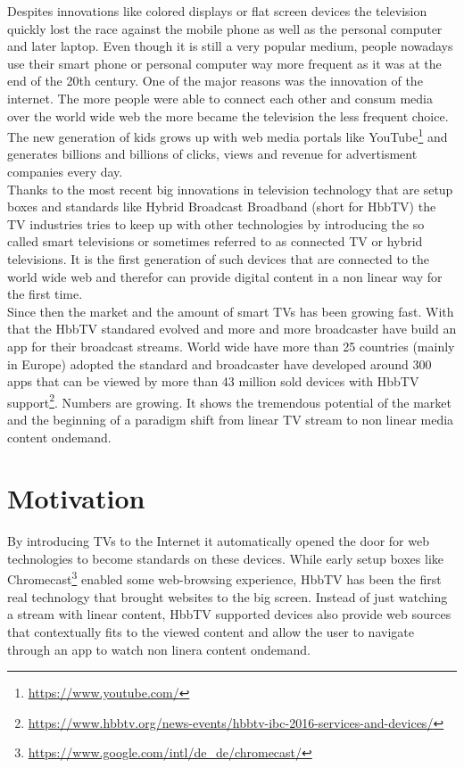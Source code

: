 Despites innovations like colored displays or flat screen devices the television quickly lost the race against
the mobile phone as well as the personal computer and later laptop. Even though it is still a very popular
medium, people nowadays use their smart phone or personal computer way more frequent as it was at the end of the
20th century. One of the major reasons was the innovation of the internet. The more people were able to connect
each other and consum media over the world wide web the more became the television the less frequent choice.
The new generation of kids grows up with web media portals like YouTube\footnote{\url{https://www.youtube.com/}}
and generates billions and billions of clicks, views and revenue for advertisment companies every day.\\
Thanks to the most recent big innovations in television technology that are setup boxes and standards like
Hybrid Broadcast Broadband (short for HbbTV) the TV industries tries to keep up with other technologies by
introducing the so called smart televisions or sometimes referred to as connected TV or hybrid televisions.
It is the first generation of such devices that are connected to the world wide web and therefor can provide
digital content in a non linear way for the first time.\\
Since then the market and the amount of smart TVs has been growing fast. With that the HbbTV standared evolved
and more and more broadcaster have build an app for their broadcast streams. World wide have more than 25
countries (mainly in Europe) adopted the standard and broadcaster have developed around 300 apps that can
be viewed by more than 43 million sold devices with HbbTV support\footnote{\url{https://www.hbbtv.org/news-events/hbbtv-ibc-2016-services-and-devices/}}.
Numbers are growing. It shows the tremendous potential of the market and the beginning of a paradigm shift
from linear TV stream to non linear media content ondemand.

\section{Motivation\label{sec:motivation}}

By introducing TVs to the Internet it automatically opened the door for web technologies to become standards
on these devices. While early setup boxes like Chromecast\footnote{\url{https://www.google.com/intl/de_de/chromecast/}}
enabled some web-browsing experience, HbbTV has been the first real technology that brought websites to the big screen.
Instead of just watching a stream with linear content, HbbTV supported devices also provide web sources that
contextually fits to the viewed content and allow the user to navigate through an app to watch non linera content
ondemand.


